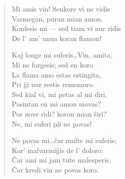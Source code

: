 \begin{verse}
                  Mi amis vin! Senkore vi ne vidis\\
                  Varmegan, puran mian amon.\\
                  Konfesis mi --- sed tiam vi nur ridis\\
                  De l' am' unua koran flamon!

                  Kaj longe mi suferis\dots Vin, amita,\\
                  Mi ne forgesis; sed en koro\\
                  La flama amo estas estingita,\\
                  Pri \^gi nur restis rememoro.\\
                  Sed kial vi, mi petas al mi diri,\\
                  Pasintan en mi amon movas?\\
                  Por nove ridi? koron mian \^siri?\\
                  Ne, mi suferi pli ne povas!

                  Ne povas mi\dots \^car multe mi suferis;\\
                  Kor' malvarmi\^gis de l' doloro;\\
                  \^Car ami mi jam tute malesperis,\\
                  \^Car kredi vin ne povas koro.

\end{verse}

\smallrule{}